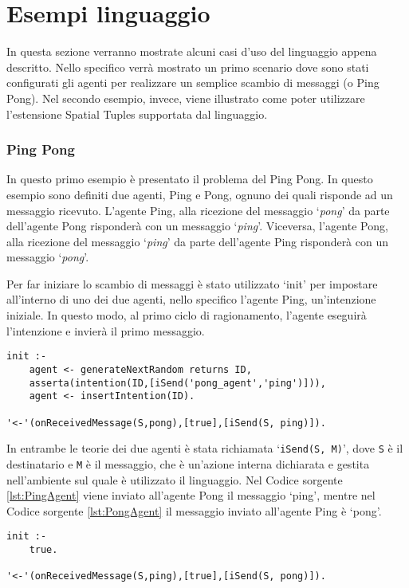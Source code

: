 \section{Esempi linguaggio}
In questa sezione verranno mostrate alcuni casi d'uso del linguaggio appena descritto. Nello specifico verrà mostrato un primo scenario dove sono stati configurati gli agenti per realizzare un semplice scambio di messaggi (o Ping Pong). Nel secondo esempio, invece, viene illustrato come poter utilizzare l'estensione Spatial Tuples supportata dal linguaggio.

\subsubsection{Ping Pong}
In questo primo esempio è presentato il problema del Ping Pong. In questo esempio sono definiti due agenti, Ping e Pong, ognuno dei quali risponde ad un messaggio ricevuto. L'agente Ping, alla ricezione del messaggio `\textit{pong}' da parte dell'agente Pong risponderà con un messaggio `\textit{ping}'. Viceversa, l'agente Pong, alla ricezione del messaggio `\textit{ping}' da parte dell'agente Ping risponderà con un messaggio `\textit{pong}'.

Per far iniziare lo scambio di messaggi è stato utilizzato `init' per impostare all'interno di uno dei due agenti, nello specifico l'agente Ping, un'intenzione iniziale. In questo modo, al primo ciclo di ragionamento, l'agente eseguirà l'intenzione e invierà il primo messaggio.

\switchToProlog{}
\begin{lstlisting}[float,firstnumber=1,label={lst:PingAgent},caption={Agente Ping}]
init :-
    agent <- generateNextRandom returns ID,
    asserta(intention(ID,[iSend('pong_agent','ping')])),
    agent <- insertIntention(ID).

'<-'(onReceivedMessage(S,pong),[true],[iSend(S, ping)]).
\end{lstlisting}

In entrambe le teorie dei due agenti è stata richiamata `\texttt{iSend(S, M)}', dove \texttt{S} è il destinatario e \texttt{M} è il messaggio, che è un'azione interna dichiarata e gestita nell'ambiente sul quale è utilizzato il linguaggio. Nel Codice sorgente \ref{lst:PingAgent} viene inviato all'agente Pong il messaggio `ping', mentre nel Codice sorgente \ref{lst:PongAgent} il messaggio inviato all'agente Ping è `pong'.

\switchToProlog{}
\begin{lstlisting}[float,firstnumber=1,label={lst:PongAgent},caption={Agente Pong}]
init :-
    true.

'<-'(onReceivedMessage(S,ping),[true],[iSend(S, pong)]).
\end{lstlisting}

